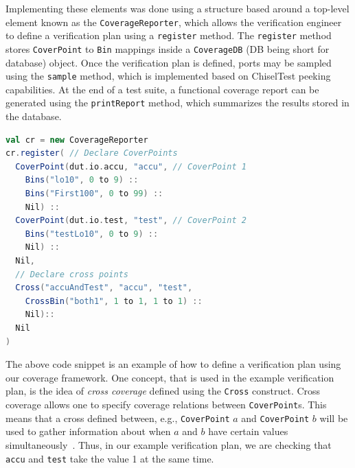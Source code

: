 \documentclass[conference]{IEEEtran}
\begin{document}
Implementing these elements was done using a structure based around a top-level element known as the \texttt{CoverageReporter}, which allows the verification engineer to define a verification plan using a \texttt{register} method. The \texttt{register} method stores \texttt{CoverPoint} to \texttt{Bin} mappings inside a \texttt{CoverageDB} (DB being short for database) object. Once the verification plan is defined, ports may be sampled using the \texttt{sample} method, which is implemented based on ChiselTest peeking capabilities. At the end of a test suite, a functional coverage report can be generated using the \texttt{printReport} method, which summarizes the results stored in the database.

\begin{lstlisting}[language=scala]
val cr = new CoverageReporter
cr.register( // Declare CoverPoints
  CoverPoint(dut.io.accu, "accu", // CoverPoint 1
    Bins("lo10", 0 to 9) ::
    Bins("First100", 0 to 99) ::
    Nil) ::
  CoverPoint(dut.io.test, "test", // CoverPoint 2
    Bins("testLo10", 0 to 9) ::
    Nil) ::
  Nil,
  // Declare cross points
  Cross("accuAndTest", "accu", "test", 
    CrossBin("both1", 1 to 1, 1 to 1) ::
    Nil)::
  Nil
)
\end{lstlisting}

The above code snippet is an example of how to define a verification plan using our coverage framework. One concept, that is used in the example verification plan, is the idea of \textit{cross coverage} defined using the \texttt{Cross} construct. Cross coverage allows one to specify coverage relations between \texttt{CoverPoint}s. This means that a cross defined between, e.g., \texttt{CoverPoint} $a$ and \texttt{CoverPoint} $b$ will be used to gather information about when $a$ and $b$ have certain values simultaneously~\cite{spear2008systemverilog}.
Thus, in our example verification plan, we are checking that \texttt{accu} and \texttt{test} take the value 1 at the same time.
\end{document}
